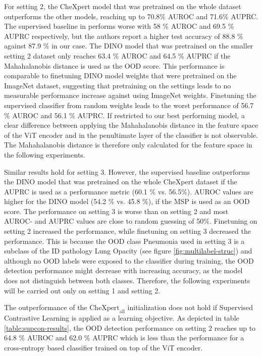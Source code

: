 For setting 2, the CheXpert model that was pretrained on the whole dataset outperforms the other models, reaching up to 70.8\% AUROC and 71.6\% AUPRC.
The supervised baseline in \citep{Berger2021} performs worse with 58 \% AUROC and 69.5 \% AUPRC respectively, but the authors report a higher test accuracy of 88.8 \% against 87.9 \% in our case.
The DINO model that was pretrained on the smaller setting 2 dataset only reaches 63.4 \% AUROC and 64.5 \% AUPRC if the Mahahalanobis distance is used as the OOD score.
This performance is comparable to finetuning DINO model weights that were pretrained on the ImageNet dataset, suggesting that pretraining on the settings leads to no measurable performance increase against using ImageNet weights.
Finetuning the supervised classifier from random weights leads to the worst performance of 56.7 \% AUROC and 56.1 \% AUPRC.
If restricted to our best performing model, a clear difference between applying the Mahahalanobis distance in the feature space of the ViT encoder and in the penultimate layer of the classifier is not observable.
The Mahahalanobis distance is therefore only calculated for the feature space in the following experiments.
\par
Similar results hold for setting 3. However, the supervised baseline outperforms the DINO model that was pretrained on the whole CheXpert dataset if the AUPRC is used as a performance metric (60.1 \% vs. 56.5\%).
AUROC values are higher for the DINO model (54.2 \% vs. 45.8 \%), if the MSP is used as an OOD score.
The performance on setting 3 is worse than on setting 2 and most AUROC- and AUPRC values are close to random guessing of 50\%.
Finetuning on setting 2 increased the performance, while finetuning on setting 3 decreased the performance.
This is because the OOD class Pneumonia used in setting 3 is a subclass of the ID pathology Lung Opacity (see figure \ref{fig:multilabel-struc}) and although no OOD labels were exposed to the classifier during training, the OOD detection performance might decrease with increasing accuracy, as the model does not distinguish between both classes.
Therefore, the following experiments will be carried out only on setting 1 and setting 2.
\par 
The outperformance of the $\text{CheXpert}_\text{all}$ initialization does not hold if Supervised Contrastive Learning is applied as a learning objective.
As depicted in table \ref{table:supcon-results}, the OOD detection performance on setting 2 reaches up to 64.8 \% AUROC and 62.0 \% AUPRC which is less than the performance for a cross-entropy based classifier trained on top of the ViT encoder.
